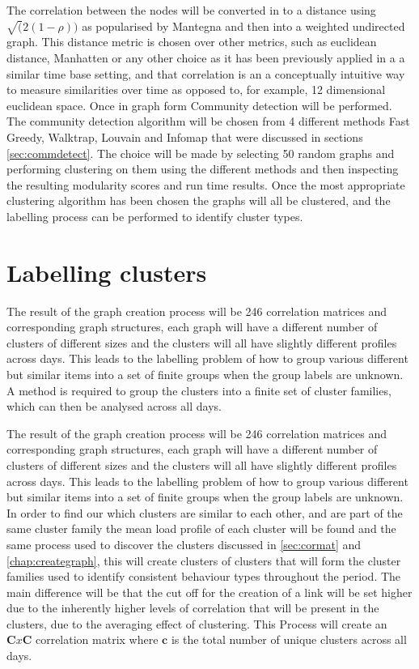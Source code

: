 The correlation between the nodes will be converted in to a distance using $\sqrt(2(1-\rho))$ as popularised by Mantegna \cite{mantegna1999} and then into a weighted undirected graph. This distance metric is chosen over other metrics, such as euclidean distance, Manhatten or any other choice as it has been previously applied in a a similar time base setting, and that correlation is an a conceptually intuitive way to measure similarities over time as opposed to, for example, 12 dimensional euclidean space.  Once in graph form Community detection will be performed. The community detection algorithm will be chosen from 4 different methods Fast Greedy, Walktrap, Louvain and Infomap that were discussed in sections \ref{sec:commdetect}. The choice will be made by selecting 50 random graphs and performing clustering on them using the different methods and then inspecting the resulting modularity scores and run time results. Once the most appropriate clustering algorithm has been chosen the graphs will all be clustered, and the labelling process can be performed to identify cluster types.

\section{Labelling clusters}
\label{sec:labelClust}

The result of the graph creation process will be 246 correlation matrices and corresponding graph structures, each graph will have a different number of clusters of different sizes and the clusters will all have slightly different profiles across days. This leads to the labelling problem of how to group various different but similar items into a set of finite groups when the group labels are unknown. A method is required to group the clusters into a finite set of cluster families, which can then be analysed across all days.

The result of the graph creation process will be 246 correlation matrices and corresponding graph structures, each graph will have a different number of clusters of different sizes and the clusters will all have slightly different profiles across days. This leads to the labelling problem of how to group various different but similar items into a set of finite groups when the group labels are unknown. In order to find our which clusters are similar to each other, and are part of the same cluster family the mean load profile of each cluster will be found and the same process used to discover the clusters discussed in \ref{sec:cormat} and \ref{chap:creategraph}, this will create clusters of clusters that will form the cluster families used to identify consistent behaviour types throughout the period.  The main difference will be that the cut off for the creation of a link will be set higher due to the inherently higher levels of correlation that will be present in the clusters, due to the averaging effect of clustering. This Process will create an $\mathbf{C}x\mathbf{C}$ correlation matrix where $\mathbf{c}$ is the total number of unique clusters across all days. 

